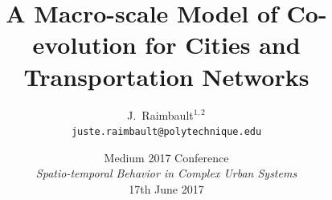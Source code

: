\documentclass[english,11pt]{beamer}
\begin{document}
\title{A Macro-scale Model of Co-evolution for Cities and Transportation Networks}

\author{J.~Raimbault$^{1,2}$\\
\texttt{juste.raimbault@polytechnique.edu}
}




\date{Medium 2017 Conference\\\smallskip
\textit{Spatio-temporal Behavior in Complex Urban Systems}\\\smallskip
17th June 2017
}


{




\frame{\maketitle}

}




\end{document}
